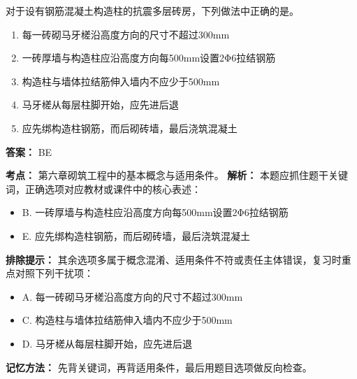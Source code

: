 \documentclass[UTF8,fontset=fandol,11pt]{ctexart}
\begin{document}
\begin{quizbox}[title={第 22 题}]
对于设有钢筋混凝土构造柱的抗震多层砖房，下列做法中正确的是。\\
\begin{enumerate}[label=\Alph*.]
\item 每一砖砌马牙槎沿高度方向的尺寸不超过300mm
\item 一砖厚墙与构造柱应沿高度方向每500mm设置2Φ6拉结钢筋
\item 构造柱与墙体拉结筋伸入墙内不应少于500mm
\item 马牙槎从每层柱脚开始，应先进后退
\item 应先绑构造柱钢筋，而后砌砖墙，最后浇筑混凝土
\end{enumerate}
\textbf{答案：} BE
\vspace{0.25em}
\begin{answerbox}[title={考点解析}]
\textbf{考点：} 第六章砌筑工程中的基本概念与适用条件。
\textbf{解析：} 本题应抓住题干关键词，正确选项对应教材或课件中的核心表述：
\begin{itemize}
\item B. 一砖厚墙与构造柱应沿高度方向每500mm设置2Φ6拉结钢筋
\item E. 应先绑构造柱钢筋，而后砌砖墙，最后浇筑混凝土
\end{itemize}
\textbf{排除提示：} 其余选项多属于概念混淆、适用条件不符或责任主体错误，复习时重点对照下列干扰项：
\begin{itemize}
\item A. 每一砖砌马牙槎沿高度方向的尺寸不超过300mm
\item C. 构造柱与墙体拉结筋伸入墙内不应少于500mm
\item D. 马牙槎从每层柱脚开始，应先进后退
\end{itemize}
\textbf{记忆方法：} 先背关键词，再背适用条件，最后用题目选项做反向检查。
\end{answerbox}
\end{quizbox}
\end{document}
